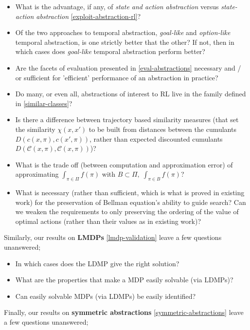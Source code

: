 \begin{itemize}
	\tightlist
	\item What is the advantage, if any, of \textit{state and action abstraction} versus \textit{state-action abstraction} \ref{exploit-abstraction-rl}?
	\item Of the two approaches to temporal abstraction, \textit{goal-like} and \textit{option-like} temporal abstraction, is one strictly better that the other? If not, then in which cases does \textit{goal-like} temporal abstraction perform better?
	\item Are the facets of evaluation presented in \ref{eval-abstractions} necessary and / or sufficient for 'efficient' performance of an abstraction in practice?
	\item Do many, or even all, abstractions of interest to RL live in the family defined in \ref{similar-classes}?
	\item Is there a difference between trajectory based similarity measures (that set the similarity $\chi(x, x')$ to be built from distances between the cumulants $D(c(x, \pi), c(x', \pi))$, rather than expected discounted cumulants $D(\mathcal C(x, \pi), \mathcal C(x, \pi))$)?
	\item What is the trade off (between computation and approximation error) of approximating $\int_{\pi \in \Pi}f(\pi)$ with $B \subset \Pi, \; \int_{\pi \in B}f(\pi)$?
	\item What is necessary (rather than sufficient, which is what is proved in existing work) for the preservation of Bellman equation's ability to guide search? Can we weaken the requirements to only preserving the ordering of the value of optimal actions (rather than their values as in existing work)?
\end{itemize}

Similarly, our results on \textbf{LMDPs} \ref{lmdp-validation} leave a few questions unanswered;

\begin{itemize}
	\tightlist
	\item In which cases does the LDMP give the right solution?
	\item What are the properties that make a MDP easily solvable (via LDMPs)?
	\item Can easily solvable MDPs (via LDMPs) be easily identified?
\end{itemize}

Finally, our results on \textbf{symmetric abstractions} \ref{symmetric-abstractions} leave a few questions unanswered;

